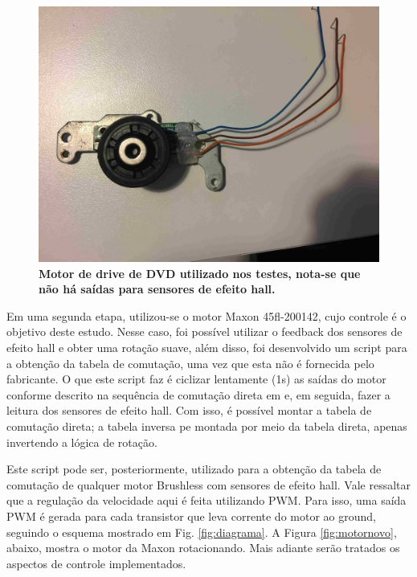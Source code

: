 \documentclass[10pt,fleqn,a4paper]{article}
\begin{document}
	\begin{figure}[ht]
		\begin{center}
			\includegraphics[angle=0, scale=0.06]{images/motorantigo}
		\end{center}
		\caption{\textbf{Motor de drive de DVD utilizado nos testes, nota-se que não há saídas para sensores de efeito hall.}}
		\label{fig:motorantigo}
	\end{figure}
    
    Em uma segunda etapa, utilizou-se o motor Maxon 45fl-200142, cujo controle é o objetivo deste estudo. Nesse caso, foi possível utilizar o feedback dos sensores de efeito hall e obter uma rotação suave, além disso, foi desenvolvido um script para a obtenção da tabela de comutação, uma vez que esta não é fornecida pelo fabricante. O que este script faz é ciclizar lentamente (1s) as saídas do motor conforme descrito na sequência de comutação direta em \cite{atmeldiagrama} e, em seguida, fazer a leitura dos sensores de efeito hall. Com isso, é possível montar a tabela de comutação direta; a tabela inversa pe montada por meio da tabela direta, apenas invertendo a lógica de rotação.
    
    Este script pode ser, posteriormente, utilizado para a obtenção da tabela de comutação de qualquer motor Brushless com sensores de efeito hall. Vale ressaltar que a regulação da velocidade aqui é feita utilizando PWM. Para isso, uma saída PWM é gerada para cada transistor que leva corrente do motor ao ground, seguindo o esquema mostrado em Fig. \ref{fig:diagrama}.
    A Figura \ref{fig:motornovo}, abaixo, mostra o motor da Maxon rotacionando. Mais adiante serão tratados os aspectos de controle implementados.
\end{document}
